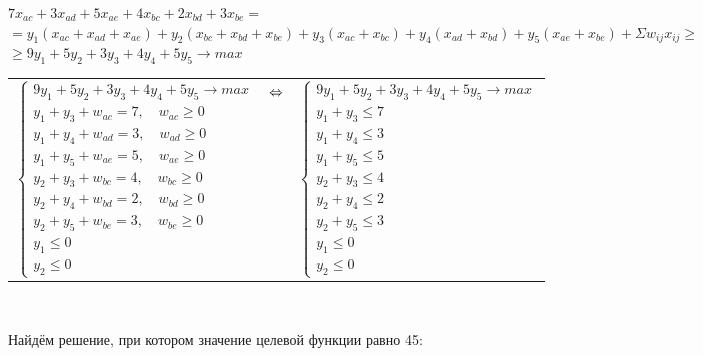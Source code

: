 \documentclass{article}
\begin{document}
	\begin{center}
		$7x_{ac} + 3x_{ad} + 5x_{ae} + 4x_{bc} + 2x_{bd} + 3x_{be} 
		=$\\$= y_1(x_{ac} + x_{ad} + x_{ae}) + y_2(x_{bc} + x_{bd} + x_{be}) + y_3(x_{ac} + x_{bc}) + y_4(x_{ad} + x_{bd}) + y_5(x_{ae} + x_{be}) + \Sigma w_{ij}x_{ij} \geq$\\$\geq 9y_1+5y_2+3y_3+4y_4+5y_5 \rightarrow max$ \\
		\begin{tabular}{ccc}
		$\begin{cases}
		9y_1+5y_2+3y_3+4y_4+5y_5 \rightarrow max \\
		y_1+y_3 + w_{ac} = 7, \quad w_{ac} \geq 0 \\
		y_1+y_4 + w_{ad} = 3, \quad w_{ad} \geq 0 \\
		y_1+y_5 + w_{ae} = 5, \quad w_{ae} \geq 0 \\
		y_2+y_3 + w_{bc} = 4, \quad w_{bc} \geq 0 \\
		y_2+y_4 + w_{bd} = 2, \quad w_{bd} \geq 0 \\
		y_2+y_5 + w_{be} = 3, \quad w_{be} \geq 0 \\
		y_1 \leq 0 \\
		y_2 \leq 0 
		\end{cases}$
		& $\hfill \Leftrightarrow \hfill$ &
			$\begin{cases}
		9y_1+5y_2+3y_3+4y_4+5y_5 \rightarrow max \\
		y_1+y_3 \leq 7 \\
		y_1+y_4 \leq 3 \\
		y_1+y_5 \leq 5 \\
		y_2+y_3 \leq 4 \\
		y_2+y_4 \leq 2 \\
		y_2+y_5 \leq 3 \\
		y_1 \leq 0 \\
		y_2 \leq 0 
		\end{cases}$
		\end{tabular}\\
	\end{center}
	Найдём решение, при котором значение целевой функции равно 45:
\end{document}
